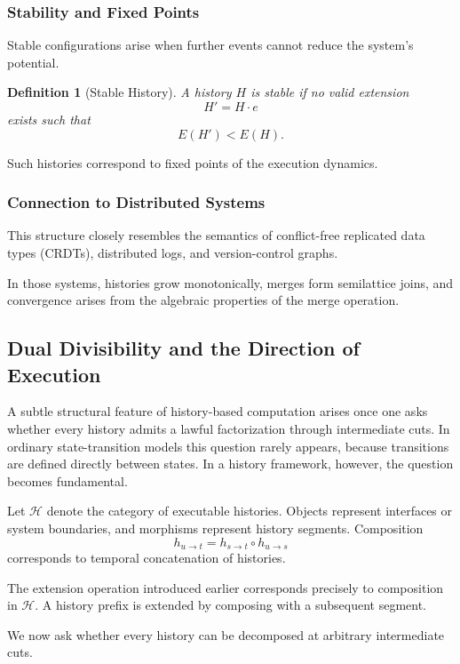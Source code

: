 \documentclass[12pt]{article}
\newtheorem{definition}{Definition}
\begin{document}
\subsubsection{Stability and Fixed Points}

Stable configurations arise when further events
cannot reduce the system's potential.

\begin{definition}[Stable History]
A history $H$ is stable if no valid extension
\[
H' = H \cdot e
\]
exists such that
\[
E(H') < E(H).
\]
\end{definition}

Such histories correspond to fixed points of the
execution dynamics.

\subsubsection{Connection to Distributed Systems}

This structure closely resembles the semantics of
conflict-free replicated data types (CRDTs),
distributed logs, and version-control graphs.

In those systems, histories grow monotonically,
merges form semilattice joins, and convergence
arises from the algebraic properties of the merge
operation.

\subsection{Dual Divisibility and the Direction of Execution}

A subtle structural feature of history-based computation arises once one
asks whether every history admits a lawful factorization through intermediate
cuts. In ordinary state-transition models this question rarely appears,
because transitions are defined directly between states. In a history
framework, however, the question becomes fundamental.

Let $\mathcal{H}$ denote the category of executable histories. Objects
represent interfaces or system boundaries, and morphisms represent
history segments. Composition
\[
h_{u\to t} = h_{s\to t} \circ h_{u\to s}
\]
corresponds to temporal concatenation of histories.

The extension operation introduced earlier corresponds precisely to
composition in $\mathcal{H}$. A history prefix is extended by composing
with a subsequent segment.

We now ask whether every history can be decomposed at arbitrary
intermediate cuts.
\end{document}
